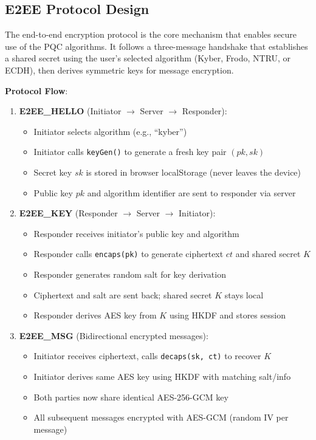 \documentclass[11pt,a4paper]{article}
\begin{document}
\subsection{E2EE Protocol Design}

The end-to-end encryption protocol is the core mechanism that enables secure use of the PQC algorithms. It follows a three-message handshake that establishes a shared secret using the user's selected algorithm (Kyber, Frodo, NTRU, or ECDH), then derives symmetric keys for message encryption.

\textbf{Protocol Flow}:

\begin{enumerate}
    \item \textbf{E2EE\_HELLO} (Initiator $\rightarrow$ Server $\rightarrow$ Responder):
    \begin{itemize}
        \item Initiator selects algorithm (e.g., ``kyber'')
        \item Initiator calls \texttt{keyGen()} to generate a fresh key pair $(pk, sk)$
        \item Secret key $sk$ is stored in browser localStorage (never leaves the device)
        \item Public key $pk$ and algorithm identifier are sent to responder via server
    \end{itemize}
    
    \item \textbf{E2EE\_KEY} (Responder $\rightarrow$ Server $\rightarrow$ Initiator):
    \begin{itemize}
        \item Responder receives initiator's public key and algorithm
        \item Responder calls \texttt{encaps(pk)} to generate ciphertext $ct$ and shared secret $K$
        \item Responder generates random salt for key derivation
        \item Ciphertext and salt are sent back; shared secret $K$ stays local
        \item Responder derives AES key from $K$ using HKDF and stores session
    \end{itemize}
    
    \item \textbf{E2EE\_MSG} (Bidirectional encrypted messages):
    \begin{itemize}
        \item Initiator receives ciphertext, calls \texttt{decaps(sk, ct)} to recover $K$
        \item Initiator derives same AES key using HKDF with matching salt/info
        \item Both parties now share identical AES-256-GCM key
        \item All subsequent messages encrypted with AES-GCM (random IV per message)
    \end{itemize}
\end{enumerate}
\end{document}
